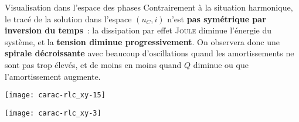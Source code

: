 \documentclass[../main/main.tex]{subfiles}
\begin{document}
\begin{NCexem}[width=\linewidth, sidebyside, hand]{Visualisation dans l'espace des phases}
    Contrairement à la situation harmonique, le tracé de la solution dans
    l'espace $(u_C,i)$ n'est \textbf{pas symétrique par inversion du temps}~: la
    dissipation par effet \textsc{Joule} diminue l'énergie du système, et la
    \textbf{tension diminue progressivement}. On observera donc une
    \textbf{spirale décroissante} avec beaucoup d'oscillations quand les
    amortissements ne sont pas trop élevés, et de moins en moins quand $Q$
    diminue ou que l'amortissement augmente.
    \tcblower
    \begin{minipage}{0.49\linewidth}
        \begin{center}
            \texttt{[image: carac-rlc\_xy-15]}
        \end{center}
    \end{minipage}
    \begin{minipage}{0.49\linewidth}
        \begin{center}
            \texttt{[image: carac-rlc\_xy-3]}
        \end{center}
    \end{minipage}
\end{NCexem}
\end{document}
